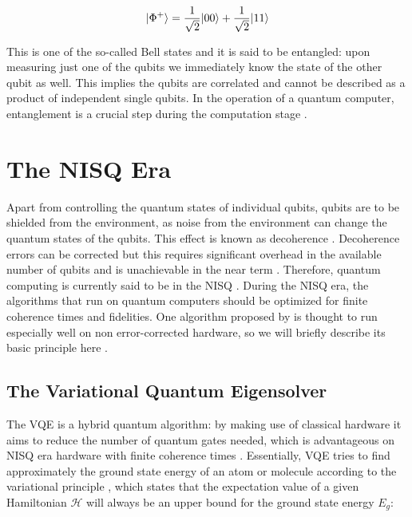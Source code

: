 \begin{equation}\label{eq:Entangled}
	\lvert\Phi^+\rangle = \frac{1}{\sqrt{2}} \lvert00\rangle+ \frac{1}{\sqrt{2}} \lvert11\rangle
\end{equation}

This is one of the so-called Bell states \cite{Nielsen2011} and it is said to be entangled: upon measuring just one of the qubits we immediately know the state of the other qubit as well. This implies the qubits are correlated and cannot be described as a product of independent single qubits. In the operation of a quantum computer, entanglement is a crucial step during the computation stage \cite{Henriet2020}. 

\section{The NISQ Era}

Apart from controlling the quantum states of individual qubits, qubits are to be shielded from the environment, as noise from the environment can change the quantum states of the qubits.  This effect is known as decoherence \cite{DiVincenzo2000}. Decoherence errors can be corrected but this requires significant overhead in the available number of qubits and is unachievable in the near term \cite{Peres1985,Ladd2010}. Therefore, quantum computing is currently said to be in the \ac{NISQ} \cite{Preskill2018}. During the \ac{NISQ} era, the algorithms that run on quantum computers should be optimized for finite coherence times and fidelities. One algorithm proposed by \cite{Peruzzo2014} is thought to run especially well on non error-corrected hardware, so we will briefly describe its basic principle here \cite{McClean2016}. 

\subsection{The Variational Quantum Eigensolver}

The \ac{VQE} is a hybrid quantum algorithm: by making use of classical hardware it aims to reduce the number of quantum gates needed, which is advantageous on NISQ era hardware with finite coherence times \cite{McClean2016}. Essentially, \ac{VQE} tries to find approximately the ground state energy of an atom or molecule according to the variational principle \cite{Griffiths2004}, which states that the expectation value of a given Hamiltonian $\mathcal{H}$ will always be an upper bound for the ground state energy $E_g$:

